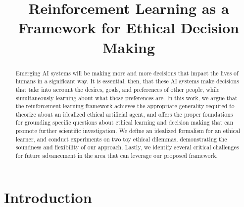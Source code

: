 \documentclass[11pt]{article}
\title{Reinforcement Learning as a Framework for Ethical Decision Making}
\author{}
\date{}                                           %
\begin{document}
\maketitle


\begin{abstract}
Emerging AI systems will be making more and more decisions that impact the lives of humans in a significant way. It is essential, then, that these AI systems make decisions that take into account the desires, goals, and preferences of other people, while simultaneously learning about what those preferences are.
In this work, we argue that the reinforcement-learning framework achieves the appropriate generality required to theorize about an idealized ethical artificial agent, and offers the proper foundations for grounding specific questions about ethical learning and decision making that can promote further scientific investigation. We define an idealized formalism for an ethical learner, and conduct experiments on two toy ethical dilemmas, demonstrating the soundness and flexibility of our approach.
Lastly, we identify several critical challenges for future advancement in the area that can leverage our proposed framework.

\end{abstract}

\section{Introduction}
\end{document}

